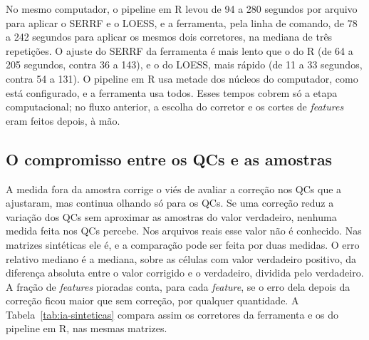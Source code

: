 No mesmo computador, o pipeline em R levou de 94 a 280 segundos por arquivo para aplicar o SERRF e o LOESS, e a ferramenta, pela linha de comando, de 78 a 242 segundos para aplicar os mesmos dois corretores, na mediana de três repetições. O ajuste do SERRF da ferramenta é mais lento que o do R (de 64 a 205 segundos, contra 36 a 143), e o do LOESS, mais rápido (de 11 a 33 segundos, contra 54 a 131). O pipeline em R usa metade dos núcleos do computador, como está configurado, e a ferramenta usa todos. Esses tempos cobrem só a etapa computacional; no fluxo anterior, a escolha do corretor e os cortes de \emph{features} eram feitos depois, à mão.

\subsection{O compromisso entre os QCs e as amostras}

A medida fora da amostra corrige o viés de avaliar a correção nos QCs que a ajustaram, mas continua olhando só para os QCs. Se uma correção reduz a variação dos QCs sem aproximar as amostras do valor verdadeiro, nenhuma medida feita nos QCs percebe. Nos arquivos reais esse valor não é conhecido. Nas matrizes sintéticas ele é, e a comparação pode ser feita por duas medidas. O erro relativo mediano é a mediana, sobre as células com valor verdadeiro positivo, da diferença absoluta entre o valor corrigido e o verdadeiro, dividida pelo verdadeiro. A fração de \emph{features} pioradas conta, para cada \emph{feature}, se o erro dela depois da correção ficou maior que sem correção, por qualquer quantidade. A Tabela~\ref{tab:ia-sinteticas} compara assim os corretores da ferramenta e os do pipeline em R, nas mesmas matrizes.

